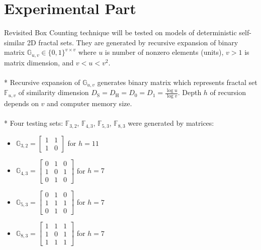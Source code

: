 \section {Experimental Part }

Revisited Box Counting technique will be tested on models of deterministic self-similar 2D fractal sets. They are generated by recursive expansion of binary matrix $\mathbb{G}_{u,v} \in \{ 0, 1 \}^{v \times v} $ where $u$ is number of nonzero elements (units), $v>1$ is matrix dimension, and $v<u<v^2$. \\
\\*
Recursive expansion of $\mathbb{G}_{u,v}$ generates binary matrix which represents fractal set $\mathbb{F}_{u,v}$ of similarity dimension $D_{\text{S}} = D_{\text{H}} = D_{0} = D_{1} = \frac{\log{u}}{\log{v}}$. Depth $h$ of recursion depends on $v$ and computer memory size.\\
\\*
Four testing sets: $\mathbb{F}_{3,2}$, $\mathbb{F}_{4,3}$, $\mathbb{F}_{5,3}$, $\mathbb{F}_{8,3}$ were generated by matrices:
\begin{itemize}
\item 

$\mathbb{G}_{3,2} = \begin{bmatrix}
1 & 1 \\
1 & 0 
\end{bmatrix}$ for $h=11$ 

\item 

$\mathbb{G}_{4,3} = \begin{bmatrix}
0 & 1 & 0 \\
1 & 0 & 1 \\
0 & 1 & 0
\end{bmatrix}$ for $h=7$

\item 

$\mathbb{G}_{5,3} = \begin{bmatrix}
0 & 1 & 0 \\
1 & 1 & 1 \\
0 & 1 & 0
\end{bmatrix}$ for $h=7$

\item 

$\mathbb{G}_{8,3} = \begin{bmatrix}
1 & 1 & 1 \\
1 & 0 & 1 \\
1 & 1 & 1
\end{bmatrix}$ for $h=7$
\end{itemize}
